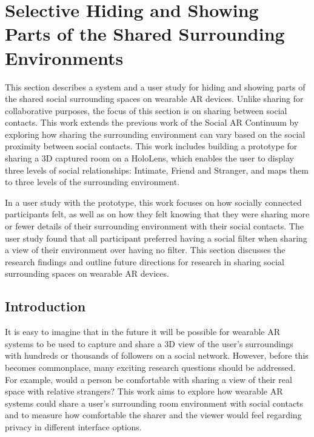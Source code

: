 \section{Selective Hiding and Showing Parts of the Shared Surrounding Environments}
\label{sec:surrounding:hiding}

This section describes a system and a user study for hiding and showing parts of the shared social surrounding spaces on wearable AR devices. Unlike sharing for collaborative purposes, the focus of this section is on sharing between social contacts. This work extends the previous work of the Social AR Continuum by exploring how sharing the surrounding environment can vary based on the social proximity between social contacts. This work includes building a prototype for sharing a 3D captured room on a HoloLens, which enables the user to display three levels of social relationships: Intimate, Friend and Stranger, and maps them to three levels of the surrounding environment. 

In a user study with the prototype, this work focuses on how socially connected participants felt, as well as on how they felt knowing that they were sharing more or fewer details of their surrounding environment with their social contacts. The user study found that all participant preferred having a social filter when sharing a view of their environment over having no filter. This section discusses the research findings and outline future directions for research in sharing social surrounding spaces on wearable AR devices. 

\subsection{Introduction}

It is easy to imagine that in the future it will be possible for wearable AR systems to be used to capture and share a 3D view of the user's surroundings with hundreds or thousands of followers on a social network. However, before this becomes commonplace, many exciting research questions should be addressed. For example, would a person be comfortable with sharing a view of their real space with relative strangers? This work aims to explore how wearable AR systems could share a user's surrounding room environment with social contacts and to measure how comfortable the sharer and the viewer would feel regarding privacy in different interface options. 

